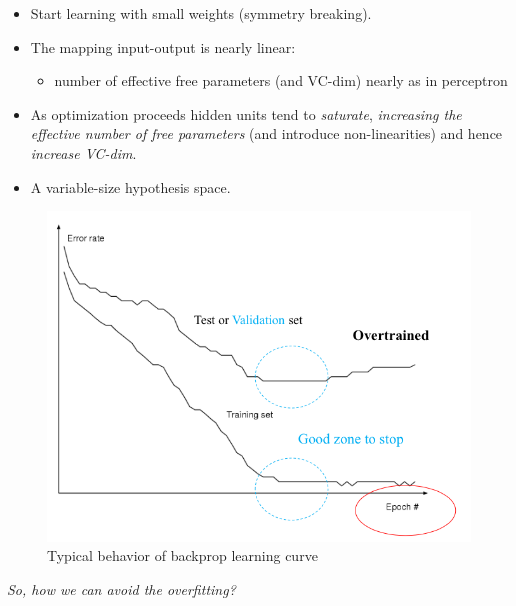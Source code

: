 \documentclass[../main.tex]{subfiles}
\begin{document}
\begin{itemize}
    \item Start learning with small weights (symmetry breaking).
    \item The mapping input-output is nearly linear:
    \begin{itemize}
        \item number of effective free parameters (and VC-dim) nearly as in perceptron
    \end{itemize}
    \item As optimization proceeds hidden units tend to \emph{saturate}, \emph{increasing the effective number of free parameters} (and introduce non-linearities) and hence \emph{increase VC-dim}.
    \item A variable-size hypothesis space.
\end{itemize}
\begin{figure}[H]
    \centering
    \includegraphics[scale = 0.35]{lectures/4_neural_networks/4_bp_learning_curve.png}
    \caption{Typical behavior of backprop learning curve}
    \label{fig:4_learning_curve_bp}
\end{figure}
\emph{So, how we can avoid the overfitting?}\\
\end{document}
